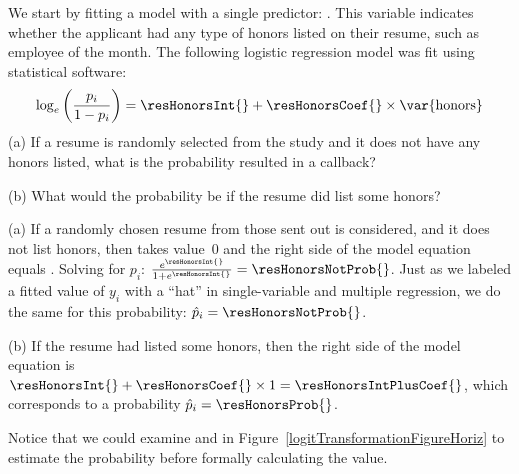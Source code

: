 \begin{examplewrap}
\begin{nexample}{We start by fitting a model with a single
    predictor: .
    This variable indicates whether the applicant had any
    type of honors listed on their resume,
    such as employee of the month.
    The following logistic regression model was fit using
    statistical software:
    \begin{align*}
    \log_e \left( \frac{p_i}{1-p_i} \right)
      = \resHonorsInt{} +
          \resHonorsCoef{} \times\text{\var{honors}}
    \end{align*}
    (a) If a resume is randomly selected from the study
    and it does not have any honors listed,
    what is the probability resulted in a callback?
    
    (b) What would the probability be if the resume did
    list some honors?}
    \label{logisticExampleWithHonors}%
  (a) If a randomly chosen resume from those sent out is considered,
  and it does not list honors, then  takes
  value~0 and the right side of the model equation equals
  \resHonorsInt{}.
  Solving for $p_i$:
  $\frac{e^{\resHonorsInt{}}}{1 + e^{\resHonorsInt{}}}
      = \resHonorsNotProb{}$.
  Just as we labeled a fitted value of $y_i$ with a ``hat''
  in single-variable and multiple regression, we do the same
  for this probability: $\hat{p}_i = \resHonorsNotProb{}$.

  (b) If the resume had listed some honors,
  then the right side of the model equation is
  $\resHonorsInt{} + \resHonorsCoef{} \times 1
      = \resHonorsIntPlusCoef{}$,
  which corresponds to a probability
  $\hat{p}_i = \resHonorsProb{}$.

  Notice that we could examine \resHonorsInt{} and
  \resHonorsIntPlusCoef{} in
  Figure~\ref{logitTransformationFigureHoriz}
  to estimate the probability before formally calculating
  the value.
\end{nexample}
\end{examplewrap}

\D{\newpage}


